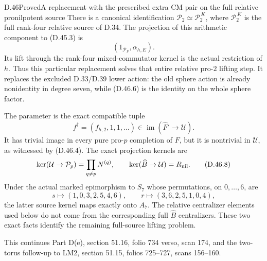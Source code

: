 \begin{statement}{D.46}{Proved}{A replacement with the prescribed extra CM pair on the full relative pronilpotent source}
There is a canonical identification
\(\mathcal P_2\simeq\mathcal P_2^{\,K}\), where
\(\mathcal P_2^{\,K}\) is the full rank-four relative
source of D.34. The projection of this arithmetic
component to (D.45.3) is
\[
             (1_{\mathcal P_F},\alpha_{h,E}).                  \tag{D.46.6}
\]
Its lift through the rank-four mixed-commutator kernel
is the actual restriction of \(h\). Thus this particular
replacement solves that entire relative pro-\(2\)
lifting step. It replaces the excluded D.33/D.39
lower action: the old sphere action is already
nonidentity in degree seven, while (D.46.6) is
the identity on the whole sphere factor.

The parameter is the exact compatible tuple
\[
                 f^\dagger=(f_{h,2},1,1,\ldots)
                    \in\operatorname{im}(\widehat F'
                                            \to\mathcal U).
                                                               \tag{D.46.7}
\]
It has trivial image in every pure pro-\(p\)
completion of \(F\), but it is nontrivial in
\(\mathcal U\), as witnessed by (D.46.4).
The exact projection kernels are
\[
 \ker(\mathcal U\to\mathcal P_p)=\prod_{q\ne p}N^{(q)},
 \qquad
 \ker(\widehat B\to\mathcal U)=R_{\rm nil}.                     \tag{D.46.8}
\]
Under the actual marked epimorphism to \(S_7\)
whose permutations, on \(0,\ldots,6\), are
\[
 s\mapsto(1,0,3,2,5,4,6),\qquad
 r\mapsto(3,6,2,5,1,0,4),
                                                               \tag{D.46.9}
\]
the latter source kernel maps exactly onto \(A_7\).
The relative centralizer elements used below do not
come from the corresponding full \(\widehat B\)
centralizers. These two exact facts identify the
remaining full-source lifting problem.

This continues Part D(e), section 51.16, folio
734 verso, scan 174, and the two-torus follow-up
to LM2, section 51.15, folios 725--727,
scans 156--160.
\end{statement}
